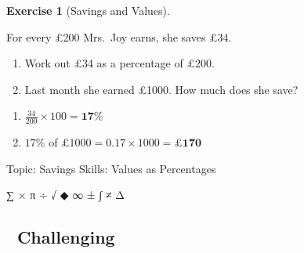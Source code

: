 \documentclass[
  letterpaper,
  DIV=11,
  numbers=noendperiod]{scrreprt}
\providecommand{\tightlist}{%
  \setlength{\itemsep}{0pt}\setlength{\parskip}{0pt}}
\theoremstyle{definition}
\newtheorem{exercise}{Exercise}[chapter]
\theoremstyle{remark}
\begin{document}
\begin{exercise}[Savings and
Values]\protect\hypertarget{exr-u1-savings-perc}{}\label{exr-u1-savings-perc}

For every £200 Mrs.~Joy earns, she saves £34.

\begin{enumerate}
\def\labelenumi{\alph{enumi})}
\tightlist
\item
  Work out £34 as a percentage of £200.\\
\item
  Last month she earned £1000. How much does she save?
\end{enumerate}

\begin{tcolorbox}[enhanced jigsaw, opacitybacktitle=0.6, coltitle=black, arc=.35mm, colframe=quarto-callout-tip-color-frame, colback=white, bottomrule=.15mm, left=2mm, colbacktitle=quarto-callout-tip-color!10!white, titlerule=0mm, opacityback=0, title=\textcolor{quarto-callout-tip-color}{\faLightbulb}\hspace{0.5em}{🔍 View Solution}, leftrule=.75mm, breakable, rightrule=.15mm, bottomtitle=1mm, toptitle=1mm, toprule=.15mm]

\begin{enumerate}
\def\labelenumi{\alph{enumi})}
\tightlist
\item
  \(\frac{34}{200} \times 100 = \mathbf{17\%}\)\\
\item
  \(17\%\) of \(£1000 = 0.17 \times 1000 = \mathbf{£170}\)
\end{enumerate}

\end{tcolorbox}

{Topic: Savings} {Skills: Values as Percentages}

\end{exercise}

∑ × π ÷ √ ◆ ∞ ± ∫ ≠ Δ

\subsection{🔴 Challenging}
\end{document}
